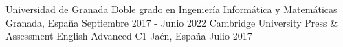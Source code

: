 

\begin{cventries}

  \cventry
    {Universidad de Granada} %
    {Doble grado en Ingeniería Informática y Matemáticas} %
    {Granada, España} %
    {Septiembre 2017 - Junio 2022} %
    {
    }
  \cventry
    {Cambridge University Press \& Assessment English} %
    {Advanced C1} %
    {Jaén, España} %
    {Julio 2017} %
    {}
\end{cventries}
